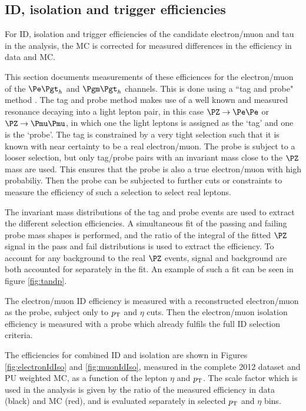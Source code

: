 \subsection{ID, isolation and trigger efficiencies}

For ID, isolation and trigger efficiencies of the candidate electron/muon 
and tau in the analysis, the \ac{MC} is corrected for measured differences in 
the efficiency in data and \ac{MC}.

This section documents measurements of these efficiences for the electron/muon 
of the $\etau$ and $\mutau$ channels. This is done using a ``tag and probe"
method \cite{Khachatryan:2010xn}.
The tag and probe method makes use of a well known and measured resonance decaying
into a light lepton pair, in this case $\PZ\to\Pe\Pe$ or $\PZ\to\Pmu\Pmu$, 
in which one the light leptons is assigned as the `tag' and one is the `probe'. 
The tag is constrained by a very tight selection such that it is known with near 
certainty to be a real electron/muon. The probe is subject to a looser selection, 
but only tag/probe pairs with an invariant mass close to the $\PZ$ mass are used. 
This ensures that the probe is also a true electron/muon with high probabiliy. 
Then the probe can be subjected to further cuts or constraints to measure the 
efficiency of such a selection to select real leptons.

The invariant mass distributions of the tag and probe events are used to extract
the different selection efficiencies. A simultaneous fit of the passing and failing probe 
mass shapes is performed, and the ratio of the integral of the fitted $\PZ$ signal 
in the pass and fail distributions is used to extract the efficiency. To account for any background
to the real $\PZ$ events, signal and background are both accounted for
separately in the fit. An example of such a fit can be seen in figure
\ref{fig:tandp}.

The electron/muon ID efficiency is measured with a reconstructed
electron/muon as the probe, subject only to $p_{\mathrm{T}}$ and $\eta$ cuts. 
Then the electron/muon isolation efficiency is measured
with a probe which already fulfils the full ID selection criteria. 

The efficiencies for combined ID and isolation are shown in Figures
\ref{fig:electronIdIso} and \ref{fig:muonIdIso}, measured in the complete 2012
dataset and PU weighted MC, as a function of the lepton $\eta$ and $p_{\mathrm{T}}$.
The scale factor which is used in the analysis is given by the ratio of the
measured efficiency in data (black) and MC (red), and is evaluated separately in
selected $p_{\mathrm{T}}$ and $\eta$ bins.

